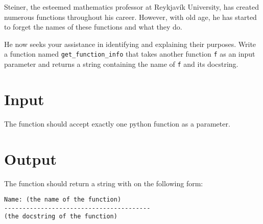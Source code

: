 
Steiner, the esteemed mathematics professor at Reykjavík University, has created numerous functions throughout his career. However, with old age, he has started to forget the names of these functions and what they do.


He now seeks your assistance in identifying and explaining their purposes. 
\newline
\newline
Write a function named \texttt{get\_function\_info} that takes another function \texttt{f} as an input parameter and returns a string containing the name of \texttt{f} and its docstring.

\section*{Input}
The function should accept exactly one python function as a parameter.

\section*{Output}
The function should return a string with on the following form:
\begin{verbatim}
Name: (the name of the function)
----------------------------------------
(the docstring of the function)
\end{verbatim}
